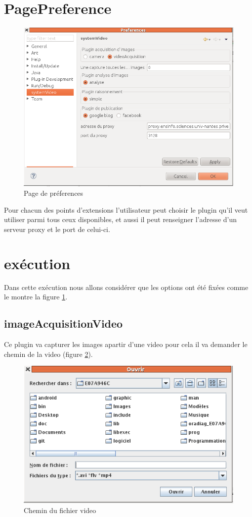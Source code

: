\documentclass[a4paper , 12pt]{article}
\begin{document}
\section{PagePreference}
\begin{figure}
  \includegraphics[scale=0.45]{images/preference.png}
  \caption{Page de préferences}
  \label{fig:preferences}
\end{figure}

Pour chacun des points d'extensions l'utilisateur peut choisir le plugin qu'il veut utiliser parmi tous ceux disponibles, et aussi il peut renseigner l'adresse d'un serveur proxy et le port de celui-ci.

\section{exécution}
Dans cette exécution nous allons considérer que les options ont été fixées comme le montre la figure \ref{fig:preferences}.
\subsection{imageAcquisitionVideo}
Ce plugin va capturer les images apartir d'une video pour cela il va demander le chemin de la video (figure \ref{fig:fichier_video}).
\begin{figure}
\includegraphics[scale=0.4]{images/fichier_video.png}
\caption{Chemin du fichier video}
\label{fig:fichier_video}
\end{figure}
\end{document}
